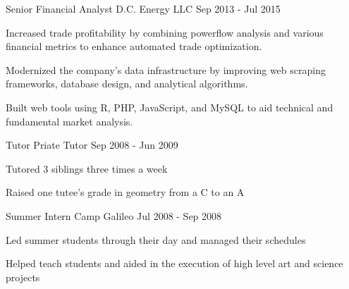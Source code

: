
\begin{cventries}
  \cventry
    {Senior Financial Analyst} %
    {D.C. Energy LLC} %
    {} %
    {Sep 2013 - Jul 2015} %
    {
      \begin{cvitems} %
        \item{Increased trade profitability by combining powerflow analysis and various financial metrics to enhance automated trade optimization.}
        \item {Modernized the company's data infrastructure by improving web scraping frameworks, database design, and analytical algorithms.}
        \item {Built web tools using R, PHP, JavaScript, and MySQL to aid technical and fundamental market analysis.}
      \end{cvitems}
    }
\ifoutdated
  \cventry
    {Tutor} %
    {Priate Tutor} %
    {} %
    {Sep 2008 - Jun 2009} %
    {
      \begin{cvitems} %
        \item Tutored 3 siblings three times a week
        \item	Raised one tutee's grade in geometry from a C to an A
      \end{cvitems}
    }
  \cventry
    {Summer Intern} %
    {Camp Galileo} %
    {} %
    {Jul 2008 - Sep 2008} %
    {
      \begin{cvitems} %
        \item Led summer students through their day and managed their schedules
        \item Helped teach students and aided in the execution of high level art and science projects
      \end{cvitems}
    }
\fi
\end{cventries}
